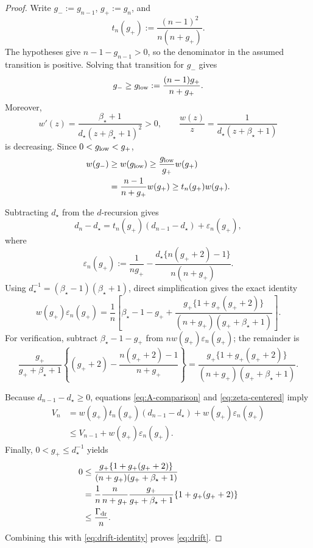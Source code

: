 \documentclass[11pt]{article}
\theoremstyle{definition}
\theoremstyle{remark}
\newcommand{\rankdens}{d}
\newcommand{\rankgain}{g}
\newcommand{\criticalexp}{\beta_{\star}}
\newcommand{\threshold}{d_{\star}}
\begin{document}
\begin{proof}
Write \(g_-:=\rankgain_{n-1}\), \(g_+:=\rankgain_n\), and
\[
 t_n(g_+):=\frac{(n-1)^2}{n(n+g_+)}.
\]
The hypotheses give \(n-1-\rankgain_{n-1}>0\), so the denominator in the
assumed transition is positive.  Solving that
transition for \(g_-\) gives
\[
 g_-\ge g_{\rm low}:=\frac{(n-1)g_+}{n+g_+}.
\]
Moreover,
\[
 w'(z)
 =\frac{\criticalexp+1}
        {\threshold(z+\criticalexp+1)^2}>0,
 \qquad
 \frac{w(z)}z
 =\frac1{\threshold(z+\criticalexp+1)}
\]
is decreasing.  Since \(0<g_{\rm low}<g_+\),
\begin{equation}
\begin{aligned}
 w(g_-)
 &\ge w(g_{\rm low})
 \ge\frac{g_{\rm low}}{g_+}w(g_+)\\
 &=\frac{n-1}{n+g_+}w(g_+)
 \ge t_n(g_+)w(g_+).
\end{aligned}
\label{eq:A-comparison}
\end{equation}

Subtracting \(\threshold\) from the \(\rankdens\)-recursion gives
\begin{equation}
 \rankdens_n-\threshold
 =t_n(g_+)(\rankdens_{n-1}-\threshold)
  +\varepsilon_n(g_+),
 \label{eq:zeta-centered}
\end{equation}
where
\[
 \varepsilon_n(g_+)
 :=\frac1{ng_+}
 -\frac{\threshold\{n(g_++2)-1\}}{n(n+g_+)}.
\]
Using
\(\threshold^{-1}=(\criticalexp-1)(\criticalexp+1)\), direct
simplification gives the exact identity
\begin{equation}
 w(g_+)\varepsilon_n(g_+)
 =\frac1n\left[
 \criticalexp-1-g_+
 +\frac{g_+\{1+g_+(g_++2)\}}
        {(n+g_+)(g_++\criticalexp+1)}
 \right].
 \label{eq:drift-identity}
\end{equation}
For verification, subtract \(\criticalexp-1-g_+\) from
\(nw(g_+)\varepsilon_n(g_+)\); the remainder is
\[
 \frac{g_+}{g_++\criticalexp+1}
 \left\{(g_++2)-\frac{n(g_++2)-1}{n+g_+}\right\}
 =\frac{g_+\{1+g_+(g_++2)\}}
        {(n+g_+)(g_++\criticalexp+1)}.
\]

Because \(\rankdens_{n-1}-\threshold\ge0\), equations
\eqref{eq:A-comparison} and \eqref{eq:zeta-centered} imply
\[
\begin{aligned}
 V_n
 &=w(g_+)t_n(g_+)
   (\rankdens_{n-1}-\threshold)
   +w(g_+)\varepsilon_n(g_+)\\
 &\le V_{n-1}
      +w(g_+)\varepsilon_n(g_+).
\end{aligned}
\]
Finally, \(0<g_+\le\threshold^{-1}\) yields
\[
\begin{aligned}
 0
 &\le
 \frac{g_+\{1+g_+(g_++2)\}}
      {(n+g_+)(g_++\criticalexp+1)}\\
 &=
 \frac1n\frac{n}{n+g_+}
 \frac{g_+}{g_++\criticalexp+1}\{1+g_+(g_++2)\}\\
 &\le
 \frac{\Gamma_{\rm dr}}n.
\end{aligned}
\]
Combining this with \eqref{eq:drift-identity} proves
\eqref{eq:drift}.
\end{proof}
\end{document}
